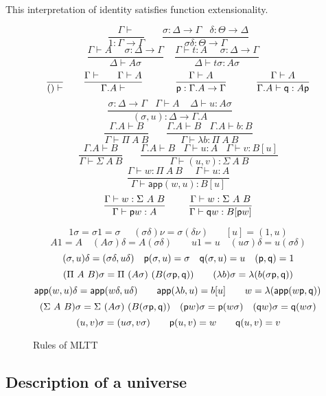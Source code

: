 \documentclass[10pt,a4paper]{article}
\newcommand{\app}{\mathsf{app}}
\newcommand{\pp}{{\sf p}}
\newcommand{\qq}{{\sf q}}
\begin{document}
\medskip

This interpretation of identity satisfies function extensionality.

\begin{figure}[t]
\caption{Rules of MLTT\label{MLTT}}
\centering
$$
\frac{\Gamma\vdash}{1:\Gamma\to \Gamma}~~~~~~~~
\frac{\sigma:\Delta\to\Gamma~~~~\delta:\Theta\to\Delta}
     {\sigma\delta:\Theta\to\Gamma}
$$
$$
\frac{\Gamma\vdash A~~~~~~\sigma:\Delta\to\Gamma}{\Delta\vdash A\sigma}~~~~~
\frac{\Gamma\vdash t:A~~~~~~\sigma:\Delta\to\Gamma}{\Delta\vdash t\sigma:A\sigma}~~~~~
$$
$$
\frac{}{()\vdash}~~~~~~
\frac{\Gamma\vdash~~~~~\Gamma\vdash A}{\Gamma.A\vdash}~~~~~~~~~~
\frac{\Gamma\vdash A}{\pp:\Gamma.A\to\Gamma}~~~~~~~~~
\frac{\Gamma\vdash A}{\Gamma.A\vdash \qq:A\pp}
$$
$$
\frac{\sigma:\Delta\to\Gamma~~~~\Gamma\vdash A~~~~~\Delta\vdash u:A\sigma}
     {(\sigma,u):\Delta\to\Gamma.A}~~~~~~~~
$$
$$
\frac{\Gamma.A\vdash B}{\Gamma\vdash\Pi~A~B}~~~~~~~~
\frac{\Gamma.A\vdash B~~~~\Gamma.A\vdash b:B}
     {\Gamma\vdash\lambda b:\Pi~A~B}
$$
$$
\frac{\Gamma.A\vdash B}{\Gamma\vdash\Sigma~A~B}~~~~~~~~
\frac{\Gamma.A\vdash B~~~~\Gamma\vdash u:A~~~~\Gamma\vdash v:B[u]}
     {\Gamma\vdash (u,v):\Sigma~A~B}
$$
$$
\frac{\Gamma\vdash w:\Pi~A~B~~~~~~\Gamma\vdash u:A}
     {\Gamma\vdash \app(w,u):B[u]}
$$
$$
\frac{\Gamma\vdash w:\Sigma~A~B}{\Gamma\vdash \pp w : A}~~~~~~~
\frac{\Gamma\vdash w:\Sigma~A~B}{\Gamma\vdash \qq w : B[\pp w]}
$$


\medskip

$$
{1\sigma = \sigma 1 = \sigma}~~~~~~{(\sigma\delta)\nu = \sigma(\delta\nu)}~~~~~~~~[u] = (1,u)
$$
$$
{A 1 = A \quad (A \sigma) \delta = A (\sigma \delta) \qquad  u 1 = u \quad
(u \sigma) \delta = u (\sigma \delta)}
$$
$$
{(\sigma,u)\delta = (\sigma\delta,u\delta)} \quad {\pp (\sigma,u) =
  \sigma} \quad {\qq(\sigma,u) = u} \quad (\pp, \qq) = 1
$$
$$
{(\Pi~A~B)\sigma = \Pi~(A\sigma)~(B(\sigma\pp,\qq))} \qquad
{(\lambda b) \sigma = \lambda (b (\sigma \pp, \qq))}
$$
$$
     {\app(w,u)\delta= \app(w\delta,u\delta)}\qquad
     {\app(\lambda b,u)= b[u]}\qquad
     {w = \lambda (\app(w \pp, \qq))} \qquad
$$
$$
(\Sigma~A~B)\sigma = \Sigma~(A\sigma)~(B(\sigma\pp,\qq)) \quad (\pp w)
\sigma = \pp (w \sigma) \quad (\qq w) \sigma = \qq (w \sigma)
$$
$$
(u, v) \sigma = (u \sigma, v \sigma) \qquad\pp (u,v) = w \qquad \qq
(u,v) = v
$$
\end{figure}

\subsection{Description of a universe}
\end{document}
